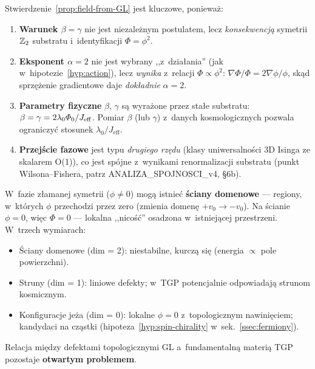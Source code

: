 \begin{remark}\label{rem:GL-physics}
Stwierdzenie~\ref{prop:field-from-GL} jest kluczowe,
poniewa\.z:
\begin{enumerate}[nosep]
  \item \textbf{Warunek $\beta = \gamma$} nie jest
    niezale\.znym postulatem, lecz \emph{konsekwencj\k{a}}
    symetrii $\mathbb{Z}_2$ substratu i~identyfikacji $\Phi = \phi^2$.
  \item \textbf{Eksponent $\alpha = 2$} nie jest wybrany
    ,,z~dzia\l{}ania'' (jak w~hipotezie~\ref{hyp:action}),
    lecz \emph{wynika} z~relacji $\Phi \propto \phi^2$:
    $\nabla\Phi/\Phi = 2\nabla\phi/\phi$,
    sk\k{a}d sprz\k{e}\.zenie gradientowe daje
    \emph{dok\l{}adnie} $\alpha = 2$.
  \item \textbf{Parametry fizyczne} $\beta$, $\gamma$
    s\k{a} wyra\.zone przez sta\l{}e substratu:
    $\beta = \gamma = 2\lambda_0\varPhi_0/J_{\mathrm{eff}}$.
    Pomiar $\beta$ (lub $\gamma$) z~danych kosmologicznych
    pozwala ograniczy\'c stosunek $\lambda_0/J_{\mathrm{eff}}$.
  \item \textbf{Przej\'scie fazowe} jest typu \emph{drugiego rz\k{e}du}
    (klasy uniwersalno\'sci 3D Isinga ze skalarem O(1)),
    co jest sp\'ojne z~wynikami renormalizacji substratu
    (punkt Wilsona--Fishera, patrz ANALIZA\_SPOJNOSCI\_v4,
    \S6b).
\end{enumerate}
\end{remark}

\begin{remark}\label{rem:GL-defects}
W~fazie z\l{}amanej symetrii ($\phi \neq 0$) mog\k{a} istnie\'c
\textbf{\'sciany domenowe} --- regiony, w~kt\'orych $\phi$
przechodzi przez zero (zmienia domen\k{e} $+v_0 \to -v_0$).
Na \'scianie $\phi = 0$, wi\k{e}c $\Phi = 0$ ---
lokalna ,,nico\'s\'c'' osadzona w~istniej\k{a}cej przestrzeni.
W~trzech wymiarach:
\begin{itemize}[nosep]
  \item \'Sciany domenowe (dim = 2): niestabilne, kurczą się
    (energia $\propto$ pole powierzchni).
  \item Struny (dim = 1): liniowe defekty; w~TGP potencjalnie
    odpowiadaj\k{a} strunom kosmicznym.
  \item Konfiguracje je\.za (dim = 0): lokalne $\phi = 0$
    z~topologicznym nawinięciem; kandydaci na cz\k{a}stki
    (hipoteza~\ref{hyp:spin-chirality} w~sek.~\ref{ssec:fermiony}).
\end{itemize}
Relacja mi\k{e}dzy defektami topologicznymi GL
a~fundamentaln\k{a} materi\k{a} TGP pozostaje
\textbf{otwartym problemem}.
\end{remark}

